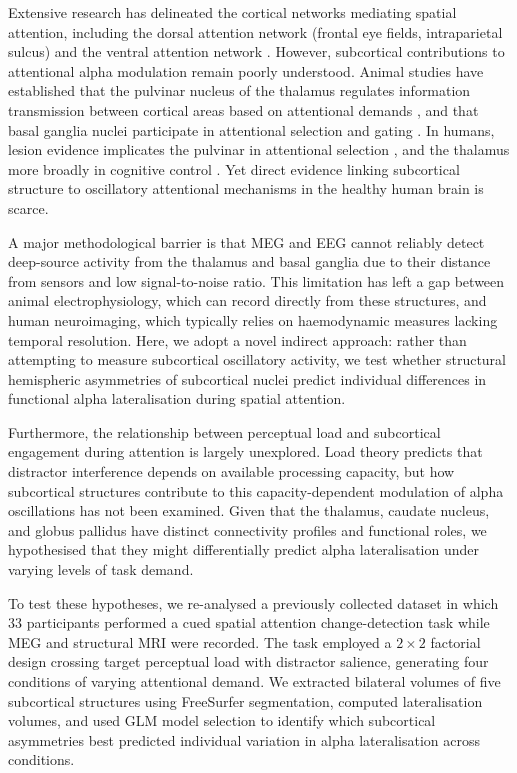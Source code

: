 \documentclass[11pt]{article}
\begin{document}
Extensive research has delineated the cortical networks mediating spatial attention, including the dorsal attention network (frontal eye fields, intraparietal sulcus) and the ventral attention network \citep{corbetta2002control, petersen2012attention, kastner2000mechanisms}. However, subcortical contributions to attentional alpha modulation remain poorly understood. Animal studies have established that the pulvinar nucleus of the thalamus regulates information transmission between cortical areas based on attentional demands \citep{saalmann2012neural, mcalonan2008guarding}, and that basal ganglia nuclei participate in attentional selection and gating \citep{desimone1995neural, lanciego2012functional}. In humans, lesion evidence implicates the pulvinar in attentional selection \citep{snow2009impaired}, and the thalamus more broadly in cognitive control \citep{halassa2014thalamic, saalmann2011cognitive}. Yet direct evidence linking subcortical structure to oscillatory attentional mechanisms in the healthy human brain is scarce.

A major methodological barrier is that MEG and EEG cannot reliably detect deep-source activity from the thalamus and basal ganglia due to their distance from sensors and low signal-to-noise ratio. This limitation has left a gap between animal electrophysiology, which can record directly from these structures, and human neuroimaging, which typically relies on haemodynamic measures lacking temporal resolution. Here, we adopt a novel indirect approach: rather than attempting to measure subcortical oscillatory activity, we test whether structural hemispheric asymmetries of subcortical nuclei predict individual differences in functional alpha lateralisation during spatial attention.

Furthermore, the relationship between perceptual load and subcortical engagement during attention is largely unexplored. Load theory \citep{lavie2005distracted} predicts that distractor interference depends on available processing capacity, but how subcortical structures contribute to this capacity-dependent modulation of alpha oscillations has not been examined. Given that the thalamus, caudate nucleus, and globus pallidus have distinct connectivity profiles and functional roles, we hypothesised that they might differentially predict alpha lateralisation under varying levels of task demand.

To test these hypotheses, we re-analysed a previously collected dataset in which 33 participants performed a cued spatial attention change-detection task while MEG and structural MRI were recorded. The task employed a $2 \times 2$ factorial design crossing target perceptual load with distractor salience, generating four conditions of varying attentional demand. We extracted bilateral volumes of five subcortical structures using FreeSurfer segmentation, computed lateralisation volumes, and used GLM model selection to identify which subcortical asymmetries best predicted individual variation in alpha lateralisation across conditions.
\end{document}
